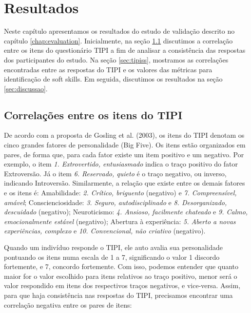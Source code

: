 

\chapter{Resultados}

\label{chap:results}

Neste capítulo apresentamos os resultados do estudo de validação descrito no capítulo \ref{chap:evaluation}. Inicialmente, na seção \ref{sec:tipitipi} discutimos a correlação entre os itens do questionário TIPI a fim de analisar a consistência das respostas dos participantes do estudo. Na seção \ref{sec:tipiss}, mostramos as correlações encontradas entre as respostas do TIPI e os valores das métricas para identificação de soft skills. Em seguida, discutimos os resultados na seção \ref{sec:discussao}.

\section{Correlações entre os itens do TIPI}
\label{sec:tipitipi}

De acordo com a proposta de Gosling et al. (2003)\nocite{gosling:03}, os itens do TIPI denotam os cinco grandes fatores de personalidade (Big Five). Os itens estão organizados em pares, de forma que,
para cada fator existe um item positivo e um negativo.
Por exemplo, o item \textit{1. Extrovertido, entusiasmado} indica o traço positivo do fator Extroversão. Já o item \textit{6. Reservado, quieto} é o traço negativo, ou inverso, indicando Introversão.
Similarmente, a relação que existe entre os demais fatores e os itens é:
Amabilidade: \textit{2. Crítico, briguento} (negativo) e \textit{7. Compreensível, amável}; 
Conscienciosidade: \textit{3. Seguro, autodisciplinado} e \textit{8. Desorganizado, descuidado} (negativo);
Neuroticismo: \textit{4. Ansioso, facilmente chateado} e \textit{9. Calmo, emocionalmente estável} (negativo);
Abertura à experiência: \textit{5. Aberto a novas experiências, complexo} e \textit{10. Convencional, não criativo} (negativo).

Quando um indivíduo responde o TIPI, ele auto avalia sua personalidade pontuando os itens numa escala de 1 a 7, significando o valor 1 discordo fortemente, e 7, concordo fortemente.
Com isso, podemos entender que quanto maior for o valor escolhido para itens relativos ao traço positivo, menor será o valor respondido em itens dos respectivos traços negativos, e vice-versa.
Assim, para que haja consistência nas respostas do TIPI, precisamos encontrar uma correlação negativa entre os pares de itens:

